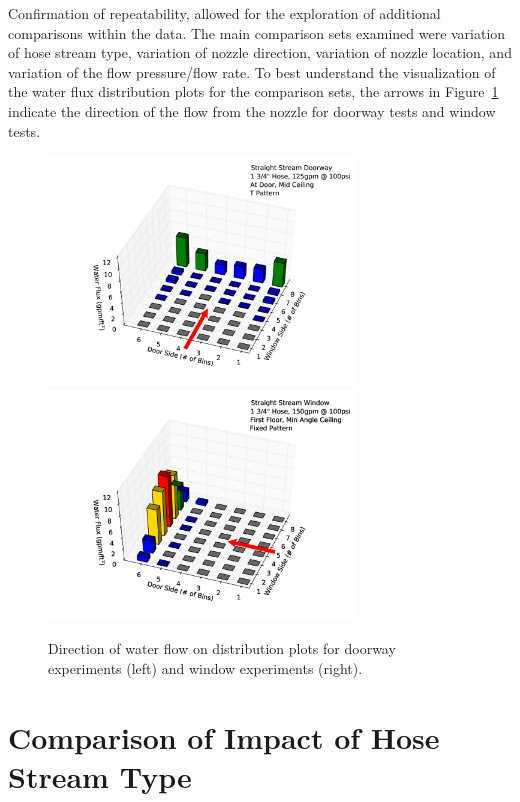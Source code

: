 \documentclass[12pt,oneside]{book}
\begin{document}
Confirmation of repeatability, allowed for the exploration of additional comparisons within the data. The main comparison sets examined were variation of hose stream type, variation of nozzle direction, variation of nozzle location, and variation of the flow pressure/flow rate. To best understand the visualization of the water flux distribution plots for the comparison sets, the arrows in Figure~\ref{fig:water_flow} indicate the direction of the flow from the nozzle for doorway tests and window tests.

\begin{figure}[ht]
\includegraphics[width=3.2in]{Figures/Water_Distribution/Water_Flux_Interior}
\includegraphics[width=3.2in]{Figures/Water_Distribution/Water_Flux_Exterior}
\caption[Direction of Water Flow on Distribution Plots]{Direction of water flow on distribution plots for doorway experiments (left) and window experiments (right).}
\label{fig:water_flow}
\end{figure}


\section{Comparison of Impact of Hose Stream Type}
\label{sec:streamtype}
\end{document}
